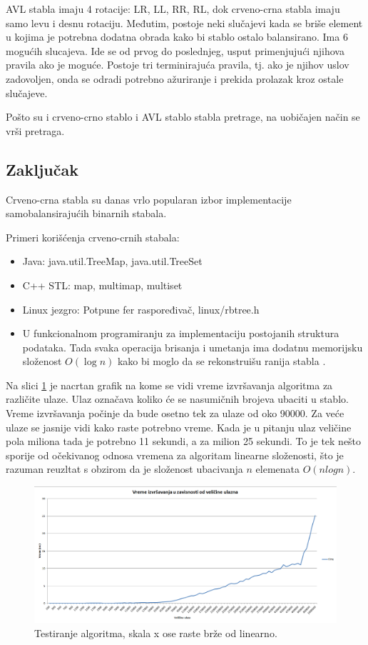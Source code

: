 \documentclass[a4paper]{article}
\begin{document}
    AVL stabla imaju 4 rotacije: LR, LL, RR, RL, dok
    crveno-crna stabla imaju samo levu i desnu rotaciju. Međutim, postoje neki slučajevi kada se briše element u kojima je potrebna dodatna obrada
    kako bi stablo ostalo balansirano.
    Ima 6 mogućih slucajeva. Ide se od prvog do poslednjeg, usput primenjujući njihova pravila ako je moguće. Postoje tri terminirajuća pravila, tj. 
    ako je njihov uslov zadovoljen, onda se odradi potrebno ažuriranje i prekida prolazak kroz ostale slučajeve.
    
    Pošto su i crveno-crno stablo i AVL stablo stabla pretrage, na uobičajen način se vrši pretraga.

\subsection{Zaključak}
Crveno-crna stabla su danas vrlo popularan izbor implementacije samobalansirajućih binarnih stabala.

Primeri korišćenja crveno-crnih stabala:
\begin{itemize}
    \item  Java: java.util.TreeMap, java.util.TreeSet
    \item C++ STL: map, multimap, multiset \cite{gcc}
    \item Linux jezgro: Potpune fer raspoređivač, linux/rbtree.h
    \item U funkcionalnom programiranju za implementaciju postojanih struktura podataka. Tada svaka operacija brisanja i umetanja ima dodatnu memorijsku složenost $O(\log n)$ kako bi moglo da se rekonstruišu ranija stabla \cite{persistent}.
\end{itemize}

Na slici \ref{fig:chart} je nacrtan grafik na kome se vidi vreme  izvršavanja algoritma za različite ulaze.
Ulaz označava koliko će se nasumičnih brojeva ubaciti u stablo.
Vreme izvršavanja počinje da bude osetno tek za ulaze od oko 90000.
Za veće ulaze se jasnije vidi kako raste potrebno vreme. Kada je u pitanju
ulaz veličine pola miliona tada je potrebno 11 sekundi, a za milion 25 sekundi.
To je tek nešto sporije od očekivanog odnosa vremena za algoritam linearne složenosti, što je 
razuman reuzltat s obzirom da je složenost ubacivanja $n$ elemenata $O(n logn)$.

\begin{figure}
    \includegraphics[width=\textwidth]{chart.png}
    \caption{Testiranje algoritma, skala x ose raste brže od linearno.}
    \label{fig:chart}
\end{figure}

\appendix
 

\end{document}
